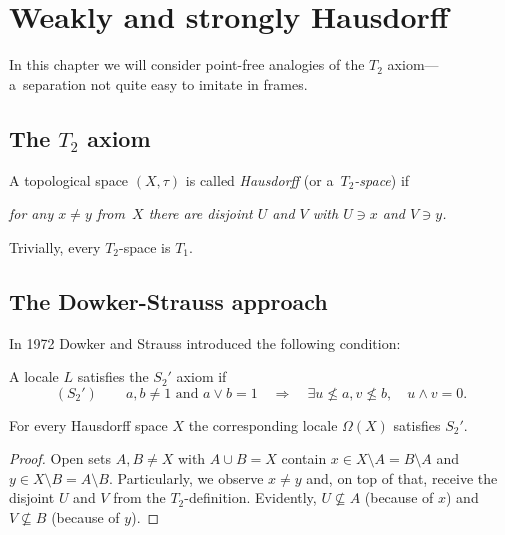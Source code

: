 \chapter{Weakly and strongly Hausdorff}

In this chapter we will consider point-free analogies of the $T_2$
axiom---a~separation not quite easy to imitate in frames.

\section{The $T_2$ axiom}

\begin{framed}
  \begin{df}[$T_2$]
    A topological space $(X, \tau)$ is called \emph{Hausdorff\/} (or
    a~\emph{$T_2$-space\/}) if
    \begin{center} \it
      for any $x \ne y$ from~$X$ there are disjoint $U$ and $V$ with $U\owns x$
      and $V\owns y$.
    \end{center}
  \end{df}
\end{framed}

\begin{rem} \label{T2->T1}
  Trivially, every $T_2$-space is $T_1$.
\end{rem}

\section{The Dowker-Strauss approach}

In 1972 Dowker and Strauss \cite{ds72} introduced the following condition:

\begin{framed}
  \begin{df}
    A locale $L$ satisfies the $S_2'$ axiom if
    \[
      (S_2') \qquad
      a, b \ne 1 \text{ and } a \vee b = 1 \quad \Rightarrow \quad \exists
      u\not\leq a, v\not\leq b, \quad u \wedge v = 0.
    \]
  \end{df}
\end{framed}

\begin{prop} \label{Haus->S2'}
  For every Hausdorff space $X$ the corresponding locale $\Omega(X)$ satisfies
  $S_2'$.
\end{prop}

\begin{proof}
  Open sets $A, B \ne X$ with $A \cup B = X$ contain $x\in X\setminus A =
  B\setminus A$ and $y\in X\setminus B = A\setminus B$.
  Particularly, we observe $x \ne y$ and, on top of that, receive the disjoint
  $U$ and $V$ from the $T_2$-definition.
  Evidently, $U\not\subseteq A$ (because of $x$) and $V\not\subseteq B$
  (because of $y$).
\end{proof}

